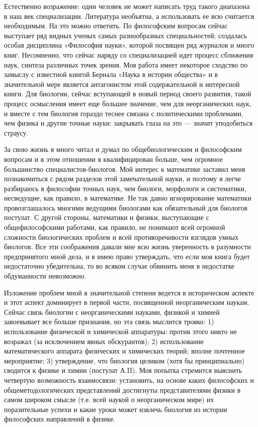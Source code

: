 Естественно возражение: один человек не может написать труд такого
диапазона в наш век специализации. Литература необъятна, а
использовать ее всю считается необходимым. На это можно ответить. По
философским вопросам сейчас выступает ряд видных ученых самых
разнообразных специальностей; создалась особая дисциплина «Философия
науки», которой посвящен ряд журналов и много книг. Несомненно, что
сейчас наряду со специализацией идет процесс сближения наук, синтеза
различных точек зрения. Моя работа имеет некоторое сходство по замыслу
с известной книгой Бернала «Наука в истории общества» и в значительной
мере является антагонистом этой содержательной и интересной книги. Для
биологии, сейчас вступающей в новый период своего развития, такой
процесс осмысления имеет еще большее значение, чем для неорганических
наук, и вместе с тем биология гораздо теснее связана с политическими
проблемами, чем физика и другие точные науки: закрывать глаза на это
--- значит уподобиться страусу.

За свою жизнь я много читал и думал по общебиологическим и философским
вопросам  и в  этом отношении  я квалифицирован  больше, чем  огромное
большинство специалистов-биологов.  Мой интерес к  математике заставил
меня  познакомиться  с  рядом  разделов этой  замечательной  науки,  и
поэтому  я легче  разбираюсь  в философии  точных  наук, чем  биологи,
морфологи  и систематики,  несведущие, как  правило, в  математике. Не
так  давно игнорирование  математики провозглашалось  многими ведущими
биологами как  обязательный для  биологов постулат. С  другой стороны,
математики  и физики,  выступающие  с  общефилософскими работами,  как
правило, не  понимают всей огромной сложности  биологических проблем и
всей  противоречивости взглядов  умных биологов.  Все эти  соображения
давали мне всю жизнь уверенность в разумности предпринятого мной дела,
и  я имею  право утверждать,  что  если моя  книга будет  недостаточно
убедительна,  то   во  всяком   случае  обвинить  меня   в  недостатке
обдуманности невозможно.

Изложение проблем  мной в значительной степени  ведется в историческом
аспекте  и   этот  аспект  доминирует  в   первой  части,  посвященной
неорганическим  наукам.   Сейчас  связь  биологии   с  неорганическими
науками, физикой  и химией  завоевывает все  больше признания,  но эта
связь  мыслится  трояко:  1)  использование  физической  и  химической
аппаратуры:  против  этого никто  не  возражал  (за исключением  явных
обскурантов); 2)  использование математического аппарата  физических и
химических  теорий;  вполне  почтенное  мероприятие;  3)  утверждение,
что  биология целиком  (хотя  бы принципиально)  сводится  к физике  и
химии  (постулат  А.II).  Моя  попытка  стремится  выяснить  четвертую
возможность  взаимосвязи: установить,  на основе  каких философских  и
общеметодологических представлений достигнуты представителями физики в
самом  широком смысле  (т.е.  всей наукой  о  неорганическом мире)  их
поразительные успехи и  какие уроки может извлечь  биология из истории
философских направлений в физике.

